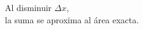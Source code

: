 \documentclass[preview]{standalone}
\begin{document}
\begin{center}
Al disminuir $\Delta x$,\\ la suma se aproxima al área exacta.
\end{center}
\end{document}
